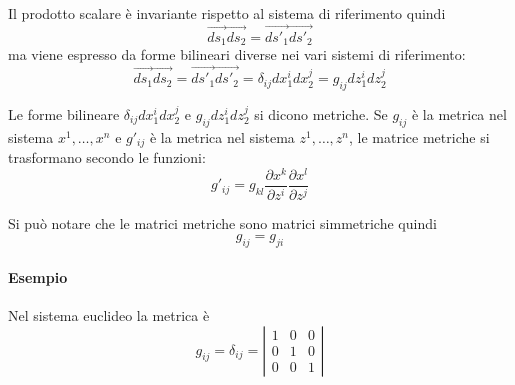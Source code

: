 \documentclass[a4paper,11pt]{article}
\begin{document}
Il prodotto scalare è invariante rispetto al sistema di riferimento quindi
\[
\vec {ds_1} \vec {ds_2} = \vec {ds'_1} \vec {ds'_2}
\]
ma viene espresso da forme bilineari diverse nei vari sistemi di riferimento:
\[
\vec {ds_1} \vec {ds_2} = \vec {ds'_1} \vec {ds'_2}  = \delta_{ij} dx_1^i dx_2^j = g_{ij} dz_1^i dz_2^j
\]

Le forme bilineare $\delta_{ij} dx_1^i dx_2^j $ e $ g_{ij} dz_1^i dz_2^j $ si dicono metriche.
Se $ g_{ij} $ è la metrica nel sistema $ x^1, \dots, x^n $ e $g'_{ij} $ è la metrica nel sistema $ z^1, \dots, z^n $, le matrice metriche si trasformano secondo le funzioni:
\begin{equation}
	g'_{ij} = g_{kl} \frac{\partial x^k}{\partial z^i} \frac{\partial x^l}{\partial z^j}
\end{equation}

Si può notare che le matrici metriche sono matrici simmetriche quindi
\[
	g_{ij} = g_{ji}
\]

\paragraph{Esempio}

Nel sistema euclideo la metrica è
\[
	g_{ij} = \delta_{ij} =
	\left|
\begin{array}{ccc}
	1 & 0 & 0
\\
	0 & 1 & 0
\\
	0 & 0 & 1
\end{array}
	\right|
\]
\end{document}
